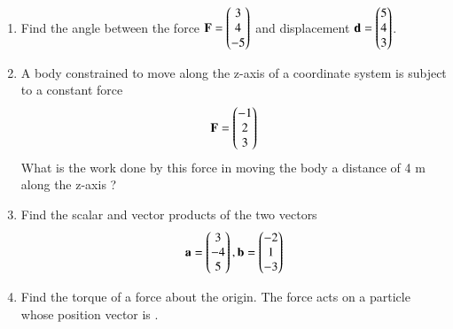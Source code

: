 \begin{enumerate}[label=\arabic*.,ref=\thesubsection.\theenumi]
\\
\solution

\item Find the angle between the force $\mathbf{F} = \begin{pmatrix}3\\4\\-5\end{pmatrix}$ and displacement $\mathbf{d} = \begin{pmatrix}5\\4\\3\end{pmatrix}$.
%
\item A body constrained to move along the z-axis of a coordinate system is subject to a constant force
\begin{align}
\mathbf{F} = \begin{pmatrix}-1\\2\\3\end{pmatrix}
\end{align}
%
What is the work done by this force in moving the body a distance of 4 m along the z-axis ?
\item Find the scalar and vector products of the two vectors
\begin{align}
\mathbf{a} = \begin{pmatrix}3\\-4\\5\end{pmatrix}, 
\mathbf{b} = \begin{pmatrix}-2\\1\\-3\end{pmatrix}
\end{align}
%
\item Find the torque of a force 
about the origin. The force
acts on a particle whose position vector is .
\end{enumerate}
%

